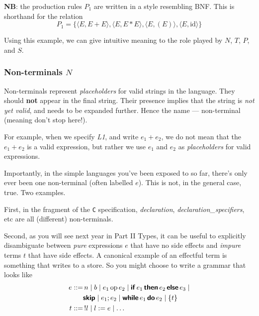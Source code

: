 \textbf{NB}: the production rules $P_1$ are written in a style resembling BNF. This is shorthand for the relation
\[P_1 = \{\langle E, E + E \rangle, \langle E, E * E \rangle, \langle E, (E) \rangle, \langle E, \text{id} \rangle\}\]

Using this example, we can give intuitive meaning to the role played by $N$, $T$, $P$, and $S$.

\subsubsection{Non-terminals $N$}
Non-terminals represent \textit{placeholders} for valid strings in the language. They should \textbf{not} appear in the final string. Their presence implies that the string is \textit{not yet valid}, and needs to be expanded further. Hence the name --- non-terminal (meaning don't stop here!). 
    
For example, when we specify \textit{L1}, and write $e_1 + e_2$, we do not mean that the $e_1 + e_2$ is a valid expression, but rather we use $e_1$ and $e_2$ as \textit{placeholders} for valid expressions.

Importantly, in the simple languages you've been exposed to so far, there's only ever been one non-terminal (often labelled $e$). This is not, in the general case, true. Two examples. 

First, in the fragment of the \texttt{C} specification, \textit{declaration}, \textit{declaration\_specifiers}, etc are all (different) non-terminals.

Second, as you will see next year in \textsf{Part II Types}, it can be useful to explicitly disambiguate between \textit{pure} expressions $e$ that have no side effects and \textit{impure} terms $t$ that have side effects. A canonical example of an effectful term is something that writes to a store. So you might choose to write a grammar that looks like
\begin{align*}
    e ::=& \, n \mid b \mid e_1 \, \text{op} \, e_2 \mid \textbf{\textsf{if}} \, e_1 \, \textbf{\textsf{then}} \, e_2 \, \textbf{\textsf{else}} \, e_3 \mid \\
    & \textbf{\textsf{skip}} \mid e_1 ; e_2 \mid \textbf{\textsf{while}} \, e_1 \, \textbf{\textsf{do}} \, e_2 \mid \{ t \} \\
    t ::= & \, !l \mid l := e \mid \ldots
\end{align*}

